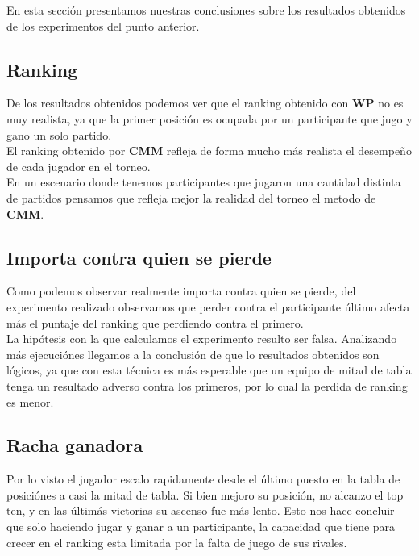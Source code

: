 En esta sección presentamos nuestras conclusiones sobre los resultados obtenidos de los experimentos del punto anterior. \\

\subsection{Ranking}

De los resultados obtenidos podemos ver que el ranking obtenido con \textbf{WP} no es muy realista, ya que la primer posición es ocupada por un participante que jugo y gano un solo partido. \\

El ranking obtenido por \textbf{CMM} refleja de forma mucho m\'as realista el desempeño de cada jugador en el torneo. \\

En un escenario donde tenemos participantes que jugaron una cantidad distinta de partidos pensamos que refleja mejor la realidad del torneo el metodo de \textbf{CMM}. \\


\subsection{\¿Importa contra quien se pierde\?}

Como podemos observar realmente importa contra quien se pierde, del experimento realizado observamos que perder contra el participante último afecta m\'as el puntaje del ranking que perdiendo 
contra el primero. \\

La hipótesis con la que calculamos el experimento resulto ser falsa. Analizando más ejecuci\'ones llegamos a la conclusión de que lo resultados obtenidos son lógicos, ya que con esta técnica 
es m\'as esperable que un equipo de mitad de tabla tenga un resultado adverso contra los primeros, por lo cual la perdida de ranking es menor. \\


\subsection{Racha ganadora}

Por lo visto el jugador escalo rapidamente desde el último puesto en la tabla de posici\'ones a casi la mitad de tabla. Si bien mejoro su posición, no alcanzo el top ten, y en las últim\'as victorias su ascenso fue m\'as lento. Esto nos hace concluir que solo haciendo jugar y ganar a un participante, la capacidad que tiene para crecer en el ranking esta limitada por la falta de juego de sus rivales.


